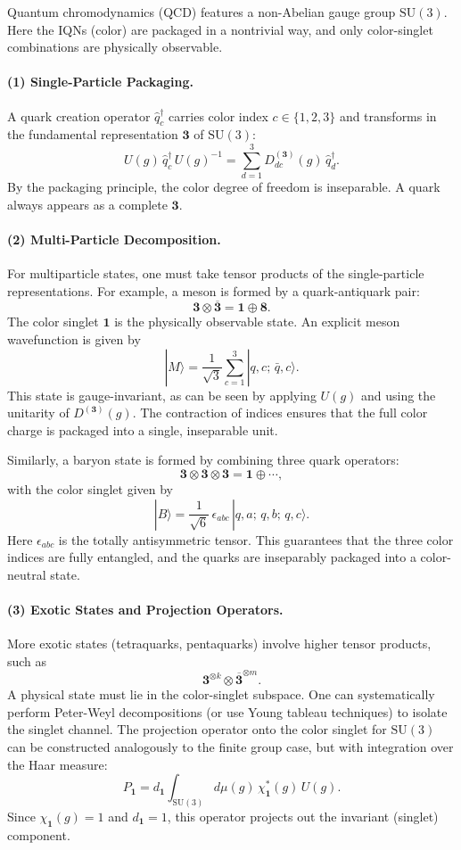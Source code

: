 \documentclass[12pt,a4paper]{article}
\begin{document}
Quantum chromodynamics (QCD) features a non-Abelian gauge group $\mathrm{SU}(3)$. Here the IQNs (color) are packaged in a nontrivial way, and only color-singlet combinations are physically observable.


\paragraph{(1) Single-Particle Packaging.}  
A quark creation operator $\hat{q}^\dagger_c$ carries color index $c \in \{1,2,3\}$ and transforms in the fundamental representation $\mathbf{3}$ of $\mathrm{SU}(3)$:
\[
U(g)\, \hat{q}^\dagger_c\, U(g)^{-1} = \sum_{d=1}^{3} D^{(\mathbf{3})}_{dc}(g)\, \hat{q}^\dagger_d.
\]
By the packaging principle, the color degree of freedom is inseparable.
A quark always appears as a complete $\mathbf{3}$.


\paragraph{(2) Multi-Particle Decomposition.}  
For multiparticle states, one must take tensor products of the single-particle representations. For example, a meson is formed by a quark-antiquark pair:
\[
\mathbf{3} \otimes \overline{\mathbf{3}} = \mathbf{1} \oplus \mathbf{8}.
\]
The color singlet $\mathbf{1}$ is the physically observable state. An explicit meson wavefunction is given by
\[
|M\rangle = \frac{1}{\sqrt{3}} \sum_{c=1}^{3} |q,c; \, \bar{q},c\rangle.
\]
This state is gauge-invariant, as can be seen by applying $U(g)$ and using the unitarity of $D^{(\mathbf{3})}(g)$.
The contraction of indices ensures that the full color charge is packaged into a single, inseparable unit.


Similarly, a baryon state is formed by combining three quark operators:
\[
\mathbf{3} \otimes \mathbf{3} \otimes \mathbf{3} = \mathbf{1} \oplus \cdots,
\]
with the color singlet given by
\[
|B\rangle = \frac{1}{\sqrt{6}}\, \epsilon_{abc}\, |q,a; \,q,b; \,q,c\rangle.
\]
Here $\epsilon_{abc}$ is the totally antisymmetric tensor. This guarantees that the three color indices are fully entangled, and the quarks are inseparably packaged into a color-neutral state.


\paragraph{(3) Exotic States and Projection Operators.}  
More exotic states (tetraquarks, pentaquarks) involve higher tensor products, such as
\[
\mathbf{3}^{\otimes k} \otimes \overline{\mathbf{3}}^{\otimes m}.
\]
A physical state must lie in the color-singlet subspace. One can systematically perform Peter-Weyl decompositions (or use Young tableau techniques) to isolate the singlet channel. The projection operator onto the color singlet for $\mathrm{SU}(3)$ can be constructed analogously to the finite group case, but with integration over the Haar measure:
\[
P_{\mathbf{1}} = d_{\mathbf{1}} \int_{\mathrm{SU}(3)} d\mu(g)\, \chi_{\mathbf{1}}^*(g)\, U(g).
\]
Since $\chi_{\mathbf{1}}(g)=1$ and $d_{\mathbf{1}}=1$, this operator projects out the invariant (singlet) component.
\end{document}
